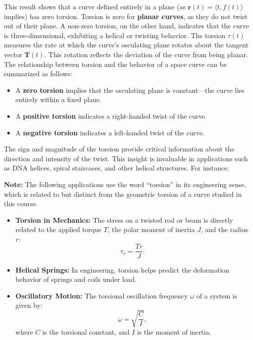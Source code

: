 \noindent This result shows that a curve defined entirely in a plane (as \( \mathbf{r}(t) = \langle t, f(t) \rangle \) implies) has zero torsion. Torsion is zero for \textbf{planar curves}, as they do not twist out of their plane. A non-zero torsion, on the other hand, indicates that the curve is three-dimensional, exhibiting a helical or twisting behavior. The torsion \( \tau(t) \) measures the rate at which the curve's osculating plane rotates about the tangent vector \( \mathbf{T}(t) \). This rotation reflects the deviation of the curve from being planar. The relationship between torsion and the behavior of a space curve can be summarized as follows:

\begin{itemize}
    \item A \textbf{zero torsion} implies that the osculating plane is constant---the curve lies entirely within a fixed plane.
    \item A \textbf{positive torsion} indicates a right-handed twist of the curve.
    \item A \textbf{negative torsion} indicates a left-handed twist of the curve.
\end{itemize}

\noindent The sign and magnitude of the torsion provide critical information about the direction and intensity of the twist. This insight is invaluable in applications such as DNA helices, spiral staircases, and other helical structures. For instance:

\textbf{Note:} The following applications use the word ``torsion'' in its engineering sense, which is related to but distinct from the geometric torsion of a curve studied in this course.

\begin{itemize}
    \item \textbf{Torsion in Mechanics:} The stress on a twisted rod or beam is directly related to the applied torque \( T \), the polar moment of inertia \( J \), and the radius \( r \):
    \[ \tau_s = \frac{T r}{J}. \]
    \item \textbf{Helical Springs:} In engineering, torsion helps predict the deformation behavior of springs and coils under load.
    \item \textbf{Oscillatory Motion:} The torsional oscillation frequency \( \omega \) of a system is given by:
    \[ \omega = \sqrt{\frac{C}{I}}, \]
    where \( C \) is the torsional constant, and \( I \) is the moment of inertia.
\end{itemize}


